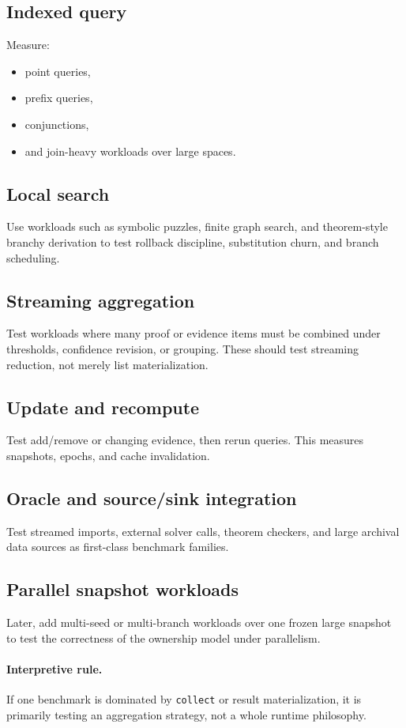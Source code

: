 \documentclass[11pt]{article}
\begin{document}
\subsection{Indexed query}
Measure:
\begin{itemize}[leftmargin=2em]
  \item point queries,
  \item prefix queries,
  \item conjunctions,
  \item and join-heavy workloads over large spaces.
\end{itemize}

\subsection{Local search}
Use workloads such as symbolic puzzles, finite graph search, and theorem-style branchy derivation to test rollback discipline, substitution churn, and branch scheduling.

\subsection{Streaming aggregation}
Test workloads where many proof or evidence items must be combined under thresholds, confidence revision, or grouping. These should test streaming reduction, not merely list materialization.

\subsection{Update and recompute}
Test add/remove or changing evidence, then rerun queries. This measures snapshots, epochs, and cache invalidation.

\subsection{Oracle and source/sink integration}
Test streamed imports, external solver calls, theorem checkers, and large archival data sources as first-class benchmark families.

\subsection{Parallel snapshot workloads}
Later, add multi-seed or multi-branch workloads over one frozen large snapshot to test the correctness of the ownership model under parallelism.

\paragraph{Interpretive rule.}
If one benchmark is dominated by \texttt{collect} or result materialization, it is primarily testing an aggregation strategy, not a whole runtime philosophy.
\end{document}
